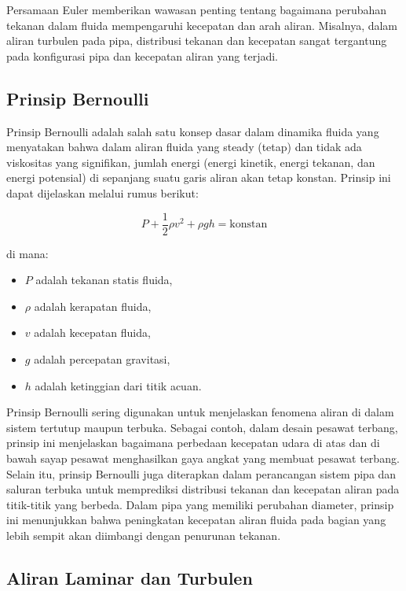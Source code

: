 Persamaan Euler memberikan wawasan penting tentang bagaimana perubahan tekanan dalam fluida mempengaruhi kecepatan dan arah aliran. Misalnya, dalam aliran turbulen pada pipa, distribusi tekanan dan kecepatan sangat tergantung pada konfigurasi pipa dan kecepatan aliran yang terjadi.

\subsection{Prinsip Bernoulli}
\label{subsubsec:prinsipbernoulli}

Prinsip Bernoulli adalah salah satu konsep dasar dalam dinamika fluida yang menyatakan bahwa dalam aliran fluida yang steady (tetap) dan tidak ada viskositas yang signifikan, jumlah energi (energi kinetik, energi tekanan, dan energi potensial) di sepanjang suatu garis aliran akan tetap konstan. Prinsip ini dapat dijelaskan melalui rumus berikut:

\[
P + \frac{1}{2} \rho v^2 + \rho gh = \text{konstan}
\]

di mana:
\begin{itemize}
    \item $P$ adalah tekanan statis fluida,
    \item $\rho$ adalah kerapatan fluida,
    \item $v$ adalah kecepatan fluida,
    \item $g$ adalah percepatan gravitasi,
    \item $h$ adalah ketinggian dari titik acuan.
\end{itemize}

Prinsip Bernoulli sering digunakan untuk menjelaskan fenomena aliran di dalam sistem tertutup maupun terbuka. Sebagai contoh, dalam desain pesawat terbang, prinsip ini menjelaskan bagaimana perbedaan kecepatan udara di atas dan di bawah sayap pesawat menghasilkan gaya angkat yang membuat pesawat terbang. Selain itu, prinsip Bernoulli juga diterapkan dalam perancangan sistem pipa dan saluran terbuka untuk memprediksi distribusi tekanan dan kecepatan aliran pada titik-titik yang berbeda. Dalam pipa yang memiliki perubahan diameter, prinsip ini menunjukkan bahwa peningkatan kecepatan aliran fluida pada bagian yang lebih sempit akan diimbangi dengan penurunan tekanan.

\subsection{Aliran Laminar dan Turbulen}
\label{subsubsec:alamanturbulen}

